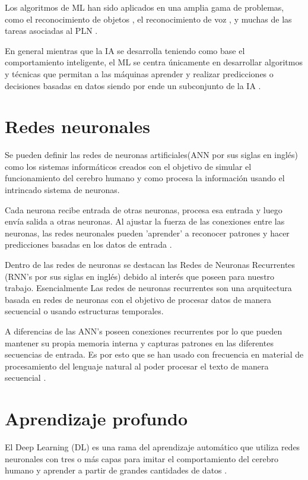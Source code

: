 Los algoritmos de ML han sido aplicados en una amplia gama de problemas, como el reconocimiento de objetos \cite{ramik2014machine}, el reconocimiento de voz \cite{tandel2020voice}, y muchas de las tareas asociadas al PLN \cite{nagarhalli2021impact}.

En general mientras que la IA se desarrolla teniendo como base el comportamiento inteligente, el ML se centra únicamente en desarrollar algoritmos y técnicas que permitan a las máquinas aprender y realizar predicciones o decisiones basadas en datos siendo por ende un subconjunto de la IA \cite{joshi2020machine}.

\section{Redes neuronales}

Se pueden definir las redes de neuronas artificiales\cite{gupta2013artificial}(ANN por sus siglas en inglés) como los sistemas informáticos creados con el objetivo de simular el funcionamiento del cerebro humano y como procesa la información usando el intrincado sistema de neuronas.

Cada neurona recibe entrada de otras neuronas, procesa esa entrada y luego envía salida a otras neuronas. Al ajustar la fuerza de las conexiones entre las neuronas, las redes neuronales pueden 'aprender' a reconocer patrones y hacer predicciones basadas en los datos de entrada \cite{krogh2008artificial}.

Dentro de las redes de neuronas se destacan las Redes de Neuronas Recurrentes \cite{medsker2001recurrent} (RNN's por sus siglas en inglés) debido al interés que poseen para nuestro trabajo. Esencialmente Las redes de neuronas recurrentes son una arquitectura basada en redes de neuronas con el objetivo de procesar datos de manera secuencial o usando estructuras temporales. 

A diferencias de las ANN's poseen conexiones recurrentes por lo que pueden mantener su propia memoria interna y capturas patrones en las diferentes secuencias de entrada. Es por esto que se han usado con frecuencia en material de procesamiento del lenguaje natural al poder procesar el texto de manera secuencial \cite{tarwani2017survey}.

\section{Aprendizaje profundo}
El Deep Learning (DL) es una rama del aprendizaje automático que utiliza redes neuronales con tres o más capas para imitar el comportamiento del cerebro humano y aprender a partir de grandes cantidades de datos \cite{lecun2015deep}. 

